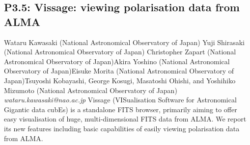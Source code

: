 \documentclass{report}
\begin{document}
\subsection*{P3.5: Vissage: viewing polarisation data from ALMA}
\bigskip
Wataru Kawasaki (National Astronomical Observatory of Japan) \newline Yuji Shirasaki (National Astronomical Observatory of Japan) \newline  Christopher Zapart (National Astronomical Observatory of Japan)\newline  Akira Yoshino (National Astronomical Observatory of Japan)\newline Eisuke Morita (National Astronomical Observatory of Japan)\newline  Tsuyoshi Kobayashi, George Kosugi, Masatoshi Ohishi, and 
Yoshihiko Mizumoto (National Astronomical Observatory of Japan)\newline\newline
{\it wataru.kawasaki@nao.ac.jp}\newline
\newline\newline
Vissage (VISualisation Software for Astronomical Gigantic data cubEs) is a standalone FITS browser, primarily aiming to offer easy visualisation of huge, multi-dimensional FITS data from ALMA. We report its new features including basic capabilities of easily viewing polarisation data from ALMA.\newline
\newpage
\end{document}

